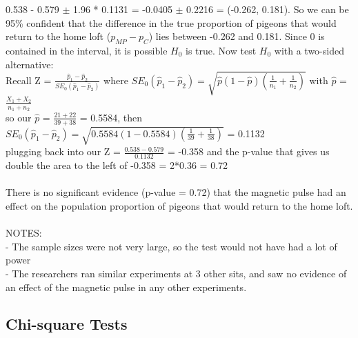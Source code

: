 \documentclass[12pt, a4paper]{article}
\begin{document}
	0.538 - 0.579 $\pm$ 1.96 * 0.1131 = -0.0405 $\pm$ 0.2216 = (-0.262, 0.181). So we can be 95\% confident that the difference in the true proportion of pigeons that would return to the home loft ($p_{MP} - p_{C}$) lies between -0.262 and 0.181. Since 0 is contained in the interval, it is possible $H_0$ is true. Now test $H_0$ with a two-sided alternative: \\
	Recall Z = $\frac{\hat{p}_1 - \hat{p}_2}{SE_0(\hat{p}_1 - \hat{p}_2)}$ where $SE_0(\hat{p}_1 - \hat{p}_2) = \sqrt{\hat{p}(1-\hat{p})(\frac{1}{n_1} + \frac{1}{n_2})}$ with $\hat{p}$ = $\frac{X_1 + X_2}{n_1 + n_2}$ \\
	so our $\hat{p}$ = $\frac{21+22}{39+38}$ = 0.5584, then $SE_0(\hat{p}_1 - \hat{p}_2) = \sqrt{0.5584(1-0.5584)(\frac{1}{39} + \frac{1}{38})}$ = 0.1132 \\
	plugging back into our Z = $\frac{0.538-0.579}{0.1132}$ = -0.358 and the p-value that gives us double the area to the left of -0.358 = 2*0.36 = 0.72 \\~\\
	There is no significant evidence (p-value = 0.72) that the magnetic pulse had an effect on the population proportion of pigeons that would return to the home loft. \\~\\
	NOTES: \\
	- The sample sizes were not very large, so the test would not have had a lot of power \\
	- The researchers ran similar experiments at 3 other sits, and saw no evidence of an effect of \hspace*{2mm} the magnetic pulse in any other experiments. \newpage
	
\begin{center} \section{Chi-square Tests} \end{center}
\end{document}
